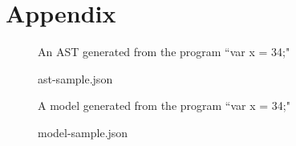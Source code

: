 \documentclass{article}
\begin{document}
\clearpage
\section*{Appendix}

\begin{figure}[h!]
	\caption{ast-sample.json}
	\label{fig:sample-ast}
	\centering
	An AST generated from the program ``var x = 34;"

	
\end{figure}

\begin{figure}[h!]
	\caption{model-sample.json}
	\label{fig:sample-model}
	\centering
	A model generated from the program ``var x = 34;"

	
\end{figure}
\end{document}
